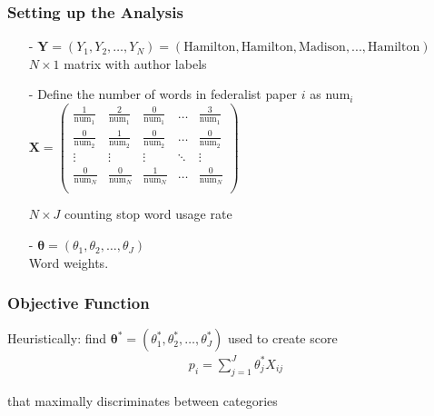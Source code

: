 \documentclass{beamer}
\numberwithin{equation}{section}
\begin{document}
\begin{frame}
\frametitle{Setting up the Analysis}

\begin{itemize}
\item[-] $\boldsymbol{Y} = (Y_{1}, Y_{2}, \hdots, Y_{N}) = (\text{Hamilton}, \text{Hamilton}, \text{Madison}, ..., \text{Hamilton})  $ \\ $N \times 1$ matrix with author labels
\item[-] Define the number of words in federalist paper $i$ as num$_{i}$
$\boldsymbol{X} = \begin{pmatrix}
\frac{1}{\text{num}_{1}}  & \frac{2}{\text{num}_{1}} & \frac{0}{\text{num}_{1}} & \hdots & \frac{3}{\text{num}_{1}}\\
\frac{0}{\text{num}_{2}} & \frac{1}{\text{num}_{2}} & \frac{0}{\text{num}_{2}} & \hdots & \frac{0}{\text{num}_{2}} \\
\vdots & \vdots & \vdots& \ddots & \vdots \\
\frac{0}{\text{num}_{N}} & \frac{0}{\text{num}_{N}} & \frac{1}{\text{num}_{N}} & \hdots & \frac{0}{\text{num}_{N}} \\
\end{pmatrix}$

 $N \times J$ counting stop word usage rate
\item[-] $\boldsymbol{\theta} = (\theta_{1}, \theta_{2}, \hdots, \theta_{J})$ \\ Word weights.\\
\end{itemize}





\end{frame}




\begin{frame}
\frametitle{Objective Function}


\alert{Heuristically}: find $\boldsymbol{\theta}^{*} = (\theta_{1}^{*}, \theta_{2}^{*}, \hdots, \theta_{J}^{*}) $ used to create score 
\begin{eqnarray}
p_{i}  = \sum_{j=1}^{J} \theta_{j}^{*} X_{ij} \nonumber 
\end{eqnarray}

 that maximally discriminates between categories 






\end{frame}
\end{document}
